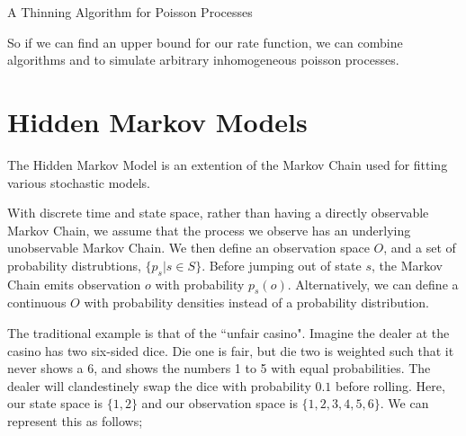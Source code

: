 \begin{algorithm}
\SetAlgoLined
{}

\caption{A Thinning Algorithm for Poisson Processes}

\end{algorithm}

So if we can find an upper bound for our rate function, we can combine algorithms %
and %
to simulate arbitrary inhomogeneous poisson processes.

\section{Hidden Markov Models}

The Hidden Markov Model is an extention of the Markov Chain used for fitting various stochastic models.

With discrete time and state space, rather than having a directly observable Markov Chain, we assume that the process we observe has an underlying unobservable Markov Chain. We then define an observation space $O$, and a set of probability distrubtions, $\{p_s | s \in S\}$. Before jumping out of state $s$, the Markov Chain emits observation $o$ with probability $p_s(o)$. Alternatively, we can define a continuous $O$ with probability densities instead of a probability distribution.

The traditional example is that of the ``unfair casino". Imagine the dealer at the casino has two six-sided dice. Die one is fair, but die two is weighted such that it never shows a $6$, and shows the numbers 1 to 5 with equal probabilities. The dealer will clandestinely swap the dice with probability $0.1$ before rolling. Here, our state space is $\{1,2\}$ and our observation space is $\{1,2,3,4,5,6\}$. We can represent this as follows;

